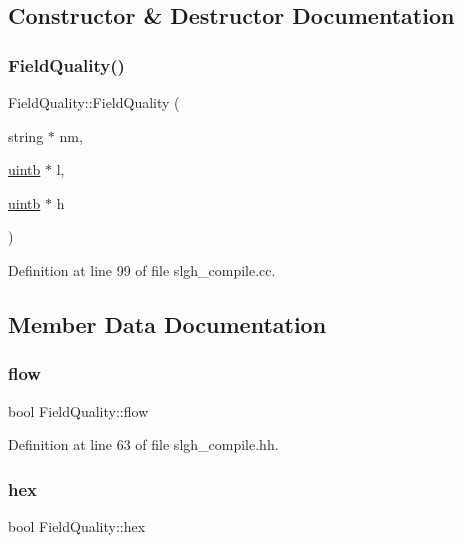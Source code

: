 \subsection{Constructor \& Destructor Documentation}
\mbox{\label{struct_field_quality_ae051ae20b019881acf37cf021adcd90d}} 
\subsubsection{\texorpdfstring{FieldQuality()}{FieldQuality()}}
{\footnotesize\ttfamily Field\+Quality\+::\+Field\+Quality (\begin{DoxyParamCaption}\item[{string $\ast$}]{nm,  }\item[{\mbox{\hyperlink{types_8h_a2db313c5d32a12b01d26ac9b3bca178f}{uintb}} $\ast$}]{l,  }\item[{\mbox{\hyperlink{types_8h_a2db313c5d32a12b01d26ac9b3bca178f}{uintb}} $\ast$}]{h }\end{DoxyParamCaption})}



Definition at line 99 of file slgh\+\_\+compile.\+cc.



\subsection{Member Data Documentation}
\mbox{\label{struct_field_quality_a64c5ba59f7b60f7ba0df52018ef410fb}} 
\subsubsection{\texorpdfstring{flow}{flow}}
{\footnotesize\ttfamily bool Field\+Quality\+::flow}



Definition at line 63 of file slgh\+\_\+compile.\+hh.

\mbox{\label{struct_field_quality_a6ada953369737161f1133c4f5cbd7b7c}} 
\subsubsection{\texorpdfstring{hex}{hex}}
{\footnotesize\ttfamily bool Field\+Quality\+::hex}



